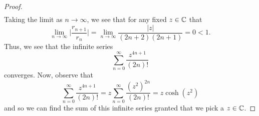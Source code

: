 \documentclass[a4paper]{article}
\begin{document}
\begin{enumerate}
\begin{proof}
\begin{align*}
        \end{align*}
        Taking the limit as \( n \to \infty  \), we see that for any fixed \( z \in \mathbb{C}  \) that
        \[ \lim_{ n \to \infty  }  \Big| \frac{ {r}_{n+1} }{ {r}_{n} }  \Big|  = \lim_{ n \to \infty  }  \frac{ | z |  }{ (2n+2)(2n+1) } = 0 < 1.   \]
        Thus, we see that the infinite series
        \[  \sum_{ n=0 }^{ \infty  } \frac{ z^{4n+1} }{ (2n)! }  \]
        converges. Now, observe that
        \[  \sum_{ n=0 }^{ \infty  } \frac{ z^{4n+1} }{ (2n)! } = z \sum_{ n=0 }^{ \infty  } \frac{ (z^{2} )^{2n}  }{ (2n)! } = z \cosh(z^{2}) \]
        and so we can find the sum of this infinite series granted that we pick a \( z \in \mathbb{C}  \).
        \end{proof}
\end{enumerate}
\end{document}
